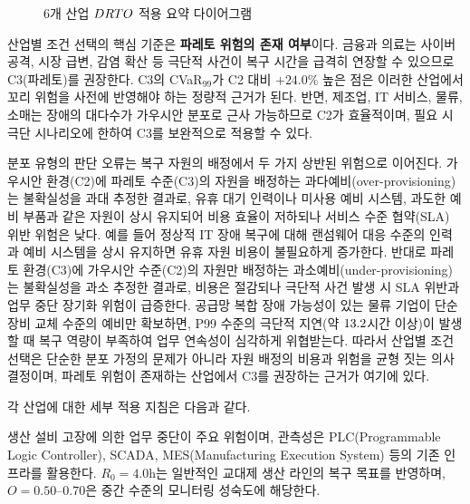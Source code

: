 \begin{figure}[htbp]
{
}%
\caption{6개 산업 $\DRTO$ 적용 요약 다이어그램}
\label{fig:ch6-industry-summary}
\end{figure}

산업별 조건 선택의 핵심 기준은 \textbf{파레토 위험의 존재 여부}이다.
금융과 의료는 사이버 공격, 시장 급변, 감염 확산 등 극단적 사건이
복구 시간을 급격히 연장할 수 있으므로 C3(파레토)를 권장한다.
C3의 CVaR$_{99}$가 C2 대비 $+24.0\%$ 높은 점은 이러한 산업에서
꼬리 위험을 사전에 반영해야 하는 정량적 근거가 된다.
반면, 제조업, IT 서비스, 물류, 소매는 장애의 대다수가 가우시안
분포로 근사 가능하므로 C2가 효율적이며, 필요 시 극단 시나리오에 한하여
C3를 보완적으로 적용할 수 있다.

분포 유형의 판단 오류는 복구 자원의 배정에서 두 가지 상반된 위험으로 이어진다.
가우시안 환경(C2)에 파레토 수준(C3)의 자원을 배정하는 과다예비(over-provisioning)는
불확실성을 과대 추정한 결과로, 유휴 대기 인력이나 미사용 예비 시스템, 과도한 예비
부품과 같은 자원이 상시 유지되어 비용 효율이 저하되나 서비스 수준 협약(SLA) 위반
위험은 낮다. 예를 들어 정상적 IT 장애 복구에 대해 랜섬웨어 대응 수준의 인력과 예비
시스템을 상시 유지하면 유휴 자원 비용이 불필요하게 증가한다. 반대로 파레토
환경(C3)에 가우시안 수준(C2)의 자원만 배정하는 과소예비(under-provisioning)는
불확실성을 과소 추정한 결과로, 비용은 절감되나 극단적 사건 발생 시 SLA 위반과
업무 중단 장기화 위험이 급증한다. 공급망 복합 장애 가능성이 있는 물류 기업이 단순
장비 교체 수준의 예비만 확보하면, P99 수준의 극단적 지연(약 $\erf{13.2}{22.7}$시간 이상)이
발생할 때 복구 역량이 부족하여 업무 연속성이 심각하게 위협받는다. 따라서 산업별
조건 선택은 단순한 분포 가정의 문제가 아니라 자원 배정의 비용과 위험을 균형 짓는
의사결정이며, 파레토 위험이 존재하는 산업에서 C3를 권장하는 근거가 여기에 있다.

각 산업에 대한 세부 적용 지침은 다음과 같다.

생산 설비 고장에 의한 업무 중단이 주요 위험이며,
관측성은 PLC(Programmable Logic Controller), SCADA, MES(Manufacturing
Execution System) 등의 기존 인프라를 활용한다.
$R_0 = 4.0$h는 일반적인 교대제 생산 라인의 복구 목표를 반영하며,
$O = 0.50$--$0.70$은 중간 수준의 모니터링 성숙도에 해당한다.

